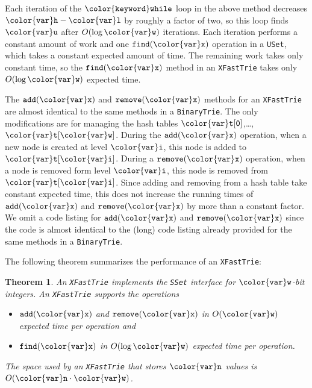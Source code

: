 \documentclass[10pt]{book}
\theoremstyle{plain}
\newtheorem{thm}{Theorem}[chapter]
\theoremstyle{definition}
\begin{document}
Each iteration of the \ensuremath{\mathtt{{\color{keyword}while}}} loop in the above method decreases \ensuremath{\mathtt{{\color{var}h}-{\color{var}l}}}
by roughly a factor of two, so this loop finds \ensuremath{\mathtt{{\color{var}u}}} after $O(\log \ensuremath{\mathtt{{\color{var}w}}})$
iterations.  Each iteration performs a constant amount of work and one
\ensuremath{\mathtt{find({\color{var}x})}} operation in a \texttt{USet}, which takes a constant expected amount
of time.  The remaining work takes only constant time, so the \ensuremath{\mathtt{find({\color{var}x})}}
method in an \texttt{XFastTrie} takes only $O(\log\ensuremath{\mathtt{{\color{var}w}}})$ expected time.

The \ensuremath{\mathtt{add({\color{var}x})}} and \ensuremath{\mathtt{remove({\color{var}x})}} methods for an \texttt{XFastTrie} are almost
identical to the same methods in a \texttt{BinaryTrie}.  The only modifications
are for managing the hash tables \ensuremath{\mathtt{{\color{var}t}[0]}},\ldots,\ensuremath{\mathtt{{\color{var}t}[{\color{var}w}]}}.  During the
\ensuremath{\mathtt{add({\color{var}x})}} operation, when a new node is created at level \ensuremath{\mathtt{{\color{var}i}}}, this node
is added to \ensuremath{\mathtt{{\color{var}t}[{\color{var}i}]}}.  During a \ensuremath{\mathtt{remove({\color{var}x})}} operation, when a node is
removed form level \ensuremath{\mathtt{{\color{var}i}}}, this node is removed from \ensuremath{\mathtt{{\color{var}t}[{\color{var}i}]}}.  Since adding
and removing from a hash table take constant expected time, this does
not increase the running times of \ensuremath{\mathtt{add({\color{var}x})}} and \ensuremath{\mathtt{remove({\color{var}x})}} by more than
a constant factor. We omit a code listing for \ensuremath{\mathtt{add({\color{var}x})}} and \ensuremath{\mathtt{remove({\color{var}x})}}
since the code is almost identical to the (long) code listing already
provided for the same methods in a \texttt{BinaryTrie}.

The following theorem summarizes the performance of an \texttt{XFastTrie}:

\begin{thm}
An \texttt{XFastTrie} implements the \texttt{SSet} interface for \ensuremath{\mathtt{{\color{var}w}}}-bit integers. An
\texttt{XFastTrie} supports the operations
\begin{itemize}
\item \ensuremath{\mathtt{add({\color{var}x})}} and \ensuremath{\mathtt{remove({\color{var}x})}} in $O(\ensuremath{\mathtt{{\color{var}w}}})$ expected time per operation and 
\item \ensuremath{\mathtt{find({\color{var}x})}} in $O(\log \ensuremath{\mathtt{{\color{var}w}}})$ expected time per operation.
\end{itemize}
The space used by an \texttt{XFastTrie} that
stores \ensuremath{\mathtt{{\color{var}n}}} values is $O(\ensuremath{\mathtt{{\color{var}n}}}\cdot\ensuremath{\mathtt{{\color{var}w}}})$.
\end{thm}
\end{document}
